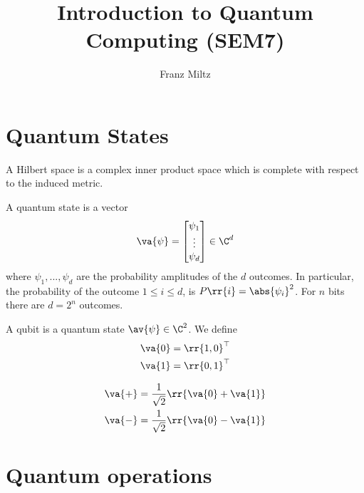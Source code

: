\documentclass{article}
\title{Introduction to Quantum Computing (SEM7)}
\author{Franz Miltz}
\begin{document}
\maketitle


\section{Quantum States}
\label{sec:quantum-states}


\begin{definition}
  \label{def:hilbert-space}
  A Hilbert space is a complex inner product space which is complete with respect to the induced metric.
\end{definition}

\begin{definition}
  \label{def:quantum-state}
  A quantum state is a vector
  \begin{align*}
    \va{ \psi } = \begin{bmatrix}
      \psi_1 \\
      \vdots \\
      \psi_d
    \end{bmatrix} \in \C^d
  \end{align*}
  where $\psi_1,...,\psi_d$ are the probability amplitudes of the $d$ outcomes.
  In particular, the probability of the outcome $1\leq i\leq d$, is $P \rr{ i } = \abs{ \psi_i }^2$.
  For $n$ bits there are $d=2^n$ outcomes.
\end{definition}

\begin{definition}
  \label{def:qubit}
  A qubit is a quantum state $ \av{ \psi } \in \C^2$. We define
  \begin{align*}
    \va{ 0 } = \rr{ 1, 0 }^\top\\
    \va{ 1 } = \rr{ 0, 1 }^\top
  \end{align*}
\end{definition}

\begin{definition}
  \label{def:superposition}
  \begin{align*}
    \va{ + } = \frac{1}{\sqrt{2}} \rr{ \va{ 0 } + \va{ 1 } } \\
    \va{ - } = \frac{1}{\sqrt{2}} \rr{ \va{ 0 } - \va{ 1 } }
  \end{align*}
\end{definition}

\section{Quantum operations}
\label{sec:quantum-operations}
\end{document}
